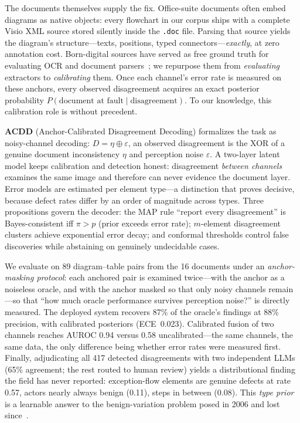 \documentclass[10pt,twocolumn]{article}
\newcommand{\eps}{\ensuremath{\varepsilon}}
\begin{document}
The documents themselves supply the fix.  Office-suite documents
often embed diagrams as native objects: every flowchart in our
corpus ships with a complete Visio XML source stored silently inside
the \texttt{.doc} file.  Parsing that source yields the diagram's
structure---texts, positions, typed connectors---\emph{exactly}, at
zero annotation cost.  Born-digital sources have served as free
ground truth for evaluating OCR and document
parsers~\cite{karatzas2011icdar,li2024chemscraper}; we repurpose
them from \emph{evaluating} extractors to \emph{calibrating} them.
Once each channel's error rate is measured on these anchors, every
observed disagreement acquires an exact posterior probability
$P(\text{document at fault} \mid \text{disagreement})$.  To our
knowledge, this calibration role is without precedent.

\textbf{ACDD} (Anchor-Calibrated Disagreement Decoding) formalizes
the task as noisy-channel decoding:
$D = \eta \oplus \varepsilon$, an observed disagreement is the XOR
of a genuine document inconsistency $\eta$ and perception noise
$\eps$.  A two-layer latent model keeps calibration and detection
honest: disagreement \emph{between channels} examines the same image
and therefore can never evidence the document layer.  Error models
are estimated per element type---a distinction that proves
decisive, because defect rates differ by an order of magnitude
across types.  Three propositions govern the decoder: the MAP rule
``report every disagreement'' is Bayes-consistent iff $\pi > p$
(prior exceeds error rate); $m$-element disagreement clusters achieve
exponential error decay; and conformal thresholds control false
discoveries while abstaining on genuinely undecidable cases.

We evaluate on 89 diagram--table pairs from the 16 documents under
an \emph{anchor-masking protocol}: each anchored pair is examined
twice---with the anchor as a noiseless oracle, and with the anchor
masked so that only noisy channels remain---so that ``how much
oracle performance survives perception noise?'' is directly
measured.  The deployed system recovers 87\% of the oracle's
findings at 88\% precision, with calibrated posteriors
(ECE~0.023).  Calibrated fusion of two channels reaches AUROC 0.94
versus 0.58 uncalibrated---the same channels, the same data, the
only difference being whether error rates were measured first.
Finally, adjudicating all 417 detected disagreements with two
independent LLMs (65\% agreement; the rest routed to human review)
yields a distributional finding the field has never reported:
exception-flow elements are genuine defects at rate 0.57, actors
nearly always benign (0.11), steps in between (0.08).  This
\emph{type prior} is a learnable answer to the benign-variation
problem posed in 2006 and lost since~\cite{chantree2006nocuous}.
\end{document}
